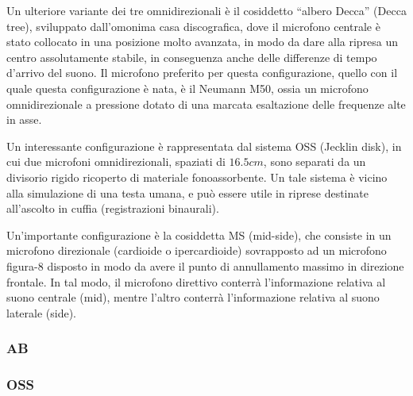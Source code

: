 Un ulteriore variante dei tre omnidirezionali è il cosiddetto “albero Decca”
(Decca tree), sviluppato dall’omonima casa discografica, dove il microfono
centrale è stato collocato in una posizione molto avanzata, in modo da dare
alla ripresa un centro assolutamente stabile, in conseguenza anche delle
differenze di tempo d’arrivo del suono. Il microfono preferito per questa
configurazione, quello con il quale questa configurazione è nata, è il
Neumann M50, ossia un microfono omnidirezionale a pressione dotato di una marcata
esaltazione delle frequenze alte in asse.

Un interessante configurazione è rappresentata dal sistema OSS (Jecklin disk),
in cui due microfoni omnidirezionali, spaziati di $16.5cm$, sono separati da un
divisorio rigido ricoperto di materiale fonoassorbente. Un tale sistema è vicino
alla simulazione di una testa umana, e può essere utile in riprese destinate
all’ascolto in cuffia (registrazioni binaurali).

Un’importante configurazione è la cosiddetta MS (mid-side), che consiste in un
microfono direzionale (cardioide o ipercardioide) sovrapposto ad un microfono
figura-8 disposto in modo da avere il punto di annullamento massimo in direzione
frontale. In tal modo, il microfono direttivo conterrà l’informazione relativa
al suono centrale (mid), mentre l’altro conterrà l’informazione relativa al
suono laterale (side).
\subsubsection*{AB}
\subsubsection*{OSS}
